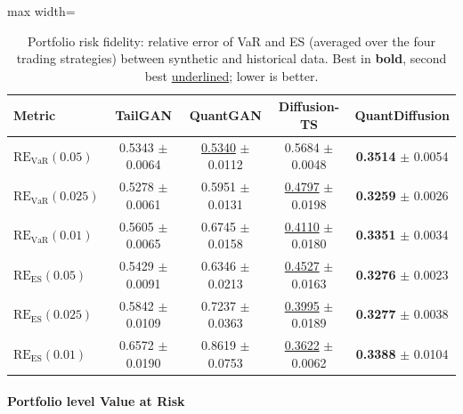 \documentclass[sigconf,natbib=false]{acmart}
\begin{document}
\begin{table}[htbp]
\centering
\caption{Portfolio risk fidelity: relative error of VaR and ES (averaged over the four trading strategies) between synthetic and historical data. Best in \textbf{bold}, second best \underline{underlined}; lower is better.}
\label{table:portfolio_risk}

\scriptsize
\setlength{\tabcolsep}{3pt}
\renewcommand{\arraystretch}{0.9}

\begin{adjustbox}{max width=\textwidth}
\begin{tabular}{l|cccc}
\toprule
\textbf{Metric} & \textbf{TailGAN} & \textbf{QuantGAN} & \textbf{Diffusion-TS} & \textbf{QuantDiffusion} \\
\midrule
$\text{RE}_{\text{VaR}}(0.05)$
& 0.5343 $\pm$ 0.0064
& \underline{0.5340} $\pm$ 0.0112
& 0.5684 $\pm$ 0.0048
& \textbf{0.3514} $\pm$ 0.0054 \\
$\text{RE}_{\text{VaR}}(0.025)$
& 0.5278 $\pm$ 0.0061
& 0.5951 $\pm$ 0.0131
& \underline{0.4797} $\pm$ 0.0198
& \textbf{0.3259} $\pm$ 0.0026 \\
$\text{RE}_{\text{VaR}}(0.01)$
& 0.5605 $\pm$ 0.0065
& 0.6745 $\pm$ 0.0158
& \underline{0.4110} $\pm$ 0.0180
& \textbf{0.3351} $\pm$ 0.0034 \\
\midrule
$\text{RE}_{\text{ES}}(0.05)$
& 0.5429 $\pm$ 0.0091
& 0.6346 $\pm$ 0.0213
& \underline{0.4527} $\pm$ 0.0163
& \textbf{0.3276} $\pm$ 0.0023 \\
$\text{RE}_{\text{ES}}(0.025)$
& 0.5842 $\pm$ 0.0109
& 0.7237 $\pm$ 0.0363
& \underline{0.3995} $\pm$ 0.0189
& \textbf{0.3277} $\pm$ 0.0038 \\
$\text{RE}_{\text{ES}}(0.01)$
& 0.6572 $\pm$ 0.0190
& 0.8619 $\pm$ 0.0753
& \underline{0.3622} $\pm$ 0.0062
& \textbf{0.3388} $\pm$ 0.0104 \\
\bottomrule
\end{tabular}
\end{adjustbox}
\end{table}

\paragraph{Portfolio level Value at Risk}
\end{document}
